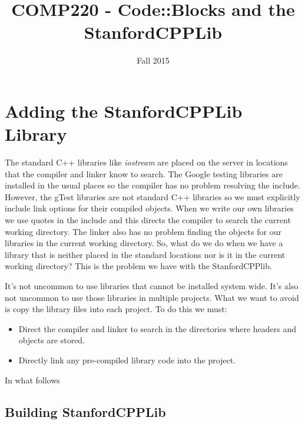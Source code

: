 \documentclass[10pt]{article}
\title{COMP220 - Code::Blocks and the StanfordCPPLib}
\author{ }
\date{Fall 2015}
\begin{document}
\maketitle

\section{ Adding the StanfordCPPLib Library }

The standard C++ libraries like \textit{iostream} are placed on the server in locations that the compiler and linker know to search. The Google testing libraries are installed in the usual places so the compiler has no problem resolving the include. However, the gTest libraries are not standard C++ libraries so we must explicitly include link options for their compiled objects. When we write our own libraries we use quotes in the include and this directs the compiler to search the current working directory.  The linker also has no problem finding the objects for our libraries in the current working directory.  So, what do we do when we have a library that is neither placed in the standard locations nor is it in the current working directory? This is the problem we have with the StanfordCPPlib.

It's not uncommon to use libraries that cannot be installed system wide. It's also not uncommon to use those libraries in multiple projects. What we want to avoid is copy the library files into each project. To do this we must:
\begin{itemize}
\item Direct the compiler and linker to search in the directories where headers and objects are stored. 
\item Directly link any pre-compiled library code into the project.
\end{itemize}

In what follows 

\subsection{ Building StanfordCPPLib }
\end{document}
